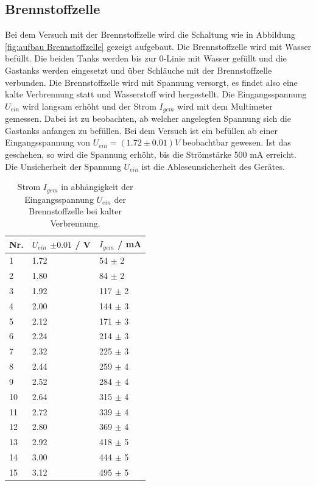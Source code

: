\documentclass[12pt,a4paper,twoside]{article}
\begin{document}
\subsection{Brennstoffzelle}
Bei dem Versuch mit der Brennstoffzelle wird die Schaltung wie in Abbildung \ref{fig:aufbau Brennstoffzelle} gezeigt aufgebaut. 
Die Brennstoffzelle wird mit Wasser befüllt. Die beiden Tanks werden bis zur 0-Linie mit Wasser gefüllt und die Gastanks werden eingesetzt und über Schläuche mit der Brennstoffzelle verbunden. 
Die Brennstoffzelle wird mit Spannung versorgt, es findet also eine kalte Verbrennung statt und Wasserstoff wird hergestellt. 
Die Eingangsspannung $U_{ein}$ wird langsam erhöht und der Strom $I_{gem}$ wird mit dem Multimeter gemessen. 
Dabei ist zu beobachten, ab welcher angelegten Spannung sich die Gastanks anfangen zu befüllen. Bei dem Versuch ist ein befüllen ab einer Eingangsspannung von $U_{ein} = (1.72 \pm 0.01) V$ beobachtbar gewesen. 
Ist das geschehen, so wird die Spannung erhöht, bis die Strömstärke 500 mA erreicht. 
\\
Die Unsicherheit der Spannung $U_{ein}$ ist die Ableseunsicherheit des Gerätes. 
\begin{table}[H]
    \centering
    \caption{Strom $I_{gem}$ in abhängigkeit der Eingangsspannung $U_{ein}$ der Brennstoffzelle bei kalter Verbrennung. }
    \label{tab:Messdaten Brennstoffzelle}
    \begin{tabular}{| l | l | l |}
        \hline
        Nr. & $U_{ein} $ $\pm 0.01 $  / V & $I_{gem}$ / mA  \\
        \hline
        1  & 1.72  & 54  $\pm$ 2  \\
        2  & 1.80  & 84  $\pm$ 2  \\
        3  & 1.92  & 117 $\pm$ 2  \\
        4  & 2.00  & 144 $\pm$ 3  \\
        5  & 2.12  & 171 $\pm$ 3  \\
        6  & 2.24  & 214 $\pm$ 3  \\
        7  & 2.32  & 225 $\pm$ 3  \\
        8  & 2.44  & 259 $\pm$ 4  \\
        9  & 2.52  & 284 $\pm$ 4  \\
        10 & 2.64  & 315 $\pm$ 4  \\
        11 & 2.72  & 339 $\pm$ 4  \\
        12 & 2.80  & 369 $\pm$ 4  \\
        13 & 2.92  & 418 $\pm$ 5  \\
        14 & 3.00  & 444 $\pm$ 5  \\
        15 & 3.12  & 495 $\pm$ 5  \\
        \hline  
    \end{tabular}
\end{table}
\end{document}
